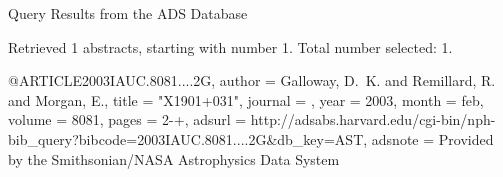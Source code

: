 Query Results from the ADS Database


Retrieved 1 abstracts, starting with number 1.  Total number selected: 1.

@ARTICLE{2003IAUC.8081....2G,
   author = {{Galloway}, D.~K. and {Remillard}, R. and {Morgan}, E.},
    title = "{X1901+031}",
  journal = {\iaucirc},
     year = 2003,
    month = feb,
   volume = 8081,
    pages = {2-+},
   adsurl = {http://adsabs.harvard.edu/cgi-bin/nph-bib_query?bibcode=2003IAUC.8081....2G&db_key=AST},
  adsnote = {Provided by the Smithsonian/NASA Astrophysics Data System}
}


